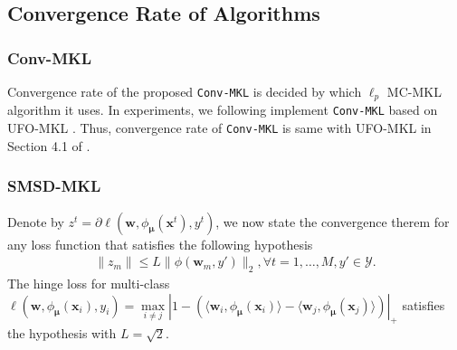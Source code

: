 \documentclass{article}
\begin{document}
\subsection{Convergence Rate of Algorithms}
\subsubsection{Conv-MKL}
Convergence rate of the proposed \texttt{Conv-MKL} is decided by which $\ell_p$ MC-MKL algorithm it uses.
In experiments, we following implement \texttt{Conv-MKL} based on UFO-MKL \cite{OrabonaL11}.
Thus, convergence rate of \texttt{Conv-MKL} is same with UFO-MKL in Section 4.1 of \cite{OrabonaL11}.
\subsubsection{SMSD-MKL}
Denote by $z^t=\partial\ell(\mathbf w,\phi_{\bm \mu}(\mathbf{x}^t), y^t)$,
we now state the convergence therem for any loss function that satisfies the following hypothesis
\begin{align}
\label{loss_function_hypothesis}
    \|z_m\| \leq L\|\phi(\mathbf w_m, y')\|_2, \forall t =1,\ldots, M, y' \in \mathcal{Y}.
\end{align}
The hinge loss for multi-class $\ell(\mathbf w,\phi_{\bm \mu}(\mathbf{x}_i), y_i)=
\max\limits_{i \not= j}\left|1-\left(\langle\mathbf w_i, \phi_{\bm \mu}(\mathbf{x}_i)\rangle -\langle\mathbf w_j, \phi_{\bm \mu}(\mathbf{x}_j)\rangle\right)\right|_+$ satisfies the hypothesis with $L=\sqrt{2}$.
\end{document}
